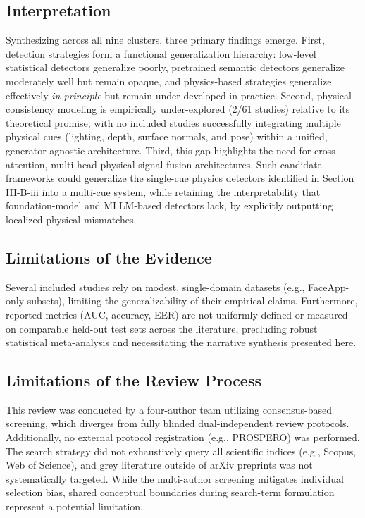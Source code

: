 \documentclass[sn-mathphys-num,Numbered,pdflatex]{sn-jnl}
\begin{document}
\subsection{Interpretation}
Synthesizing across all nine clusters, three primary findings emerge. First, detection strategies form a functional generalization hierarchy: low-level statistical detectors generalize poorly, pretrained semantic detectors generalize moderately well but remain opaque, and physics-based strategies generalize effectively \emph{in principle} but remain under-developed in practice. Second, physical-consistency modeling is empirically under-explored (2/61 studies) relative to its theoretical promise, with no included studies successfully integrating multiple physical cues (lighting, depth, surface normals, and pose) within a unified, generator-agnostic architecture. Third, this gap highlights the need for cross-attention, multi-head physical-signal fusion architectures. Such candidate frameworks could generalize the single-cue physics detectors identified in Section III-B-iii into a multi-cue system, while retaining the interpretability that foundation-model and MLLM-based detectors lack, by explicitly outputting localized physical mismatches.

\subsection{Limitations of the Evidence}
Several included studies rely on modest, single-domain datasets (e.g., FaceApp-only subsets), limiting the generalizability of their empirical claims. Furthermore, reported metrics (AUC, accuracy, EER) are not uniformly defined or measured on comparable held-out test sets across the literature, precluding robust statistical meta-analysis and necessitating the narrative synthesis presented here.

\subsection{Limitations of the Review Process}
This review was conducted by a four-author team utilizing consensus-based screening, which diverges from fully blinded dual-independent review protocols. Additionally, no external protocol registration (e.g., PROSPERO) was performed. The search strategy did not exhaustively query all scientific indices (e.g., Scopus, Web of Science), and grey literature outside of arXiv preprints was not systematically targeted. While the multi-author screening mitigates individual selection bias, shared conceptual boundaries during search-term formulation represent a potential limitation.
\end{document}
